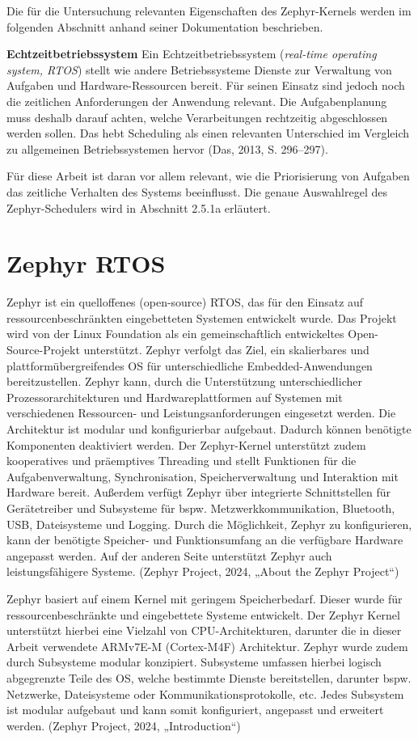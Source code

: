 Die für die Untersuchung relevanten Eigenschaften des Zephyr-Kernels werden im folgenden Abschnitt anhand seiner Dokumentation beschrieben.

\textbf{Echtzeitbetriebssystem} Ein Echtzeitbetriebssystem (\emph{real-time operating system, RTOS}) stellt wie andere Betriebssysteme Dienste zur Verwaltung von Aufgaben und Hardware-Ressourcen bereit. Für seinen Einsatz sind jedoch noch die zeitlichen Anforderungen der Anwendung relevant. Die Aufgabenplanung muss deshalb darauf achten, welche Verarbeitungen rechtzeitig abgeschlossen werden sollen. Das hebt Scheduling als einen relevanten Unterschied im Vergleich zu allgemeinen Betriebssystemen hervor (Das, 2013, S. 296–297).

Für diese Arbeit ist daran vor allem relevant, wie die Priorisierung von Aufgaben das zeitliche Verhalten des Systems beeinflusst. Die genaue Auswahlregel des Zephyr-Schedulers wird in Abschnitt 2.5.1a erläutert.

\section{Zephyr RTOS}
Zephyr ist ein quelloffenes (open-source) RTOS, das für den Einsatz auf ressourcenbeschränkten eingebetteten Systemen entwickelt wurde. Das Projekt wird von der Linux Foundation als ein gemeinschaftlich entwickeltes Open-Source-Projekt unterstützt. Zephyr verfolgt das Ziel, ein skalierbares und plattformübergreifendes OS für unterschiedliche Embedded-Anwendungen bereitzustellen. Zephyr kann, durch die Unterstützung unterschiedlicher Prozessorarchitekturen und Hardwareplattformen auf Systemen mit verschiedenen Ressourcen- und Leistungsanforderungen eingesetzt werden. Die Architektur ist modular und konfigurierbar aufgebaut. Dadurch können benötigte Komponenten deaktiviert werden. Der Zephyr-Kernel unterstützt zudem kooperatives und präemptives Threading und stellt Funktionen für die Aufgabenverwaltung, Synchronisation, Speicherverwaltung und Interaktion mit Hardware bereit. Außerdem verfügt Zephyr über integrierte Schnittstellen für Gerätetreiber und Subsysteme für bspw. Metzwerkkommunikation, Bluetooth, USB, Dateisysteme und Logging. Durch die Möglichkeit, Zephyr zu konfigurieren, kann der benötigte Speicher- und Funktionsumfang an die verfügbare Hardware angepasst werden. Auf der anderen Seite unterstützt Zephyr auch leistungsfähigere Systeme. (Zephyr Project, 2024, „About the Zephyr Project“)

Zephyr basiert auf einem Kernel mit geringem Speicherbedarf. Dieser wurde für ressourcenbeschränkte und eingebettete Systeme entwickelt. Der Zephyr Kernel unterstützt hierbei eine Vielzahl von CPU-Architekturen, darunter die in dieser Arbeit verwendete ARMv7E-M (Cortex-M4F) Architektur. Zephyr wurde zudem durch Subsysteme modular konzipiert. Subsysteme umfassen hierbei logisch abgegrenzte Teile des OS, welche bestimmte Dienste bereitstellen, darunter bspw. Netzwerke, Dateisysteme oder Kommunikationsprotokolle, etc. Jedes Subsystem ist modular aufgebaut und kann somit konfiguriert, angepasst und erweitert werden. (Zephyr Project, 2024, „Introduction“)

